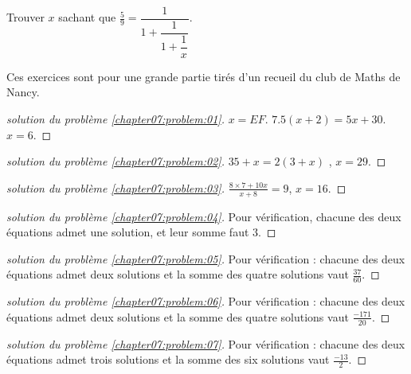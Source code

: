 \documentclass[main.tex]{subfiles}
\begin{document}
\begin{problem}\label{chapter07:problem:12} 
Trouver $x$ sachant que $\frac{5}{9}=\dfrac{1}{1+\dfrac{1}{1+\dfrac{1}{x}}}$.
\end{problem}
%	
\begin{remark} Ces exercices sont pour une grande partie tirés d'un recueil du club de Maths de Nancy.
	\end{remark}
\begin{proof}[solution du problème \ref{chapter07:problem:01}]  

$x=EF$. $7.5(x+2)=5x+30$. $x=6$.  

\end{proof} 
\begin{proof}[solution du problème \ref{chapter07:problem:02}]  

$35+x=2(3+x)$ , $x=29$.  

\end{proof} 
\begin{proof}[solution du problème \ref{chapter07:problem:03}]  

$\frac{8\times 7 +10x}{x+8}=9$, $x=16$.
\end{proof} 
\begin{proof}[solution du problème \ref{chapter07:problem:04}]  

Pour vérification, chacune des deux équations admet une solution, et leur somme faut $3$.

\end{proof} 
\begin{proof}[solution du problème \ref{chapter07:problem:05}]  

Pour vérification : chacune des deux équations admet deux solutions et la somme des quatre solutions vaut $\frac{37}{60}$.

\end{proof} 
\begin{proof}[solution du problème \ref{chapter07:problem:06}]  

Pour vérification : chacune des deux équations admet deux solutions et la somme des quatre solutions vaut $\frac{-171}{20}$.

\end{proof} 
\begin{proof}[solution du problème \ref{chapter07:problem:07}]  

Pour vérification : chacune des deux équations admet trois solutions et la somme des six solutions vaut $\frac{-13}{2}$.

\end{proof}  
\end{document}
